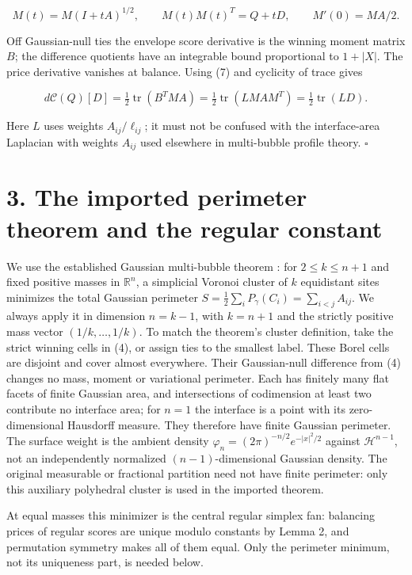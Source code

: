 \documentclass[11pt]{article}
\begin{document}
\[
 M(t)=M(I+tA)^{1/2},\qquad M(t)M(t)^T=Q+tD,\qquad
 M'(0)=MA/2.
\]

Off Gaussian-null ties the envelope score derivative is the winning
moment matrix \(B\); the difference quotients have an integrable bound
proportional to \(1+|X|\). The price derivative vanishes at balance.
Using (7) and cyclicity of trace gives

\[
 d\mathcal C(Q)[D]=\tfrac12\operatorname{tr}(B^TMA)
   =\tfrac12\operatorname{tr}(LMAM^T)
   =\tfrac12\operatorname{tr}(LD).
\]

Here \(L\) uses weights \(A_{ij}/\ell_{ij}\); it must not be confused
with the interface-area Laplacian with weights \(A_{ij}\) used elsewhere
in multi-bubble profile theory. \(\square\)

\section{3. The imported perimeter theorem and the regular
constant}\label{the-imported-perimeter-theorem-and-the-regular-constant}

We use the established Gaussian multi-bubble theorem
\cite[Theorem 1.1]{MN22}: for \(2\le k\le n+1\) and fixed positive
masses in \(\mathbb R^n\), a simplicial Voronoi cluster of \(k\)
equidistant sites minimizes the total Gaussian perimeter
\(S=\frac12\sum_i P_\gamma(C_i)=\sum_{i<j}A_{ij}\). We always apply it
in dimension \(n=k-1\), with \(k=n+1\) and the strictly positive mass
vector \((1/k,\ldots,1/k)\). To match the theorem's cluster definition,
take the strict winning cells in (4), or assign ties to the smallest
label. These Borel cells are disjoint and cover almost everywhere. Their
Gaussian-null difference from (4) changes no mass, moment or variational
perimeter. Each has finitely many flat facets of finite Gaussian area,
and intersections of codimension at least two contribute no interface
area; for \(n=1\) the interface is a point with its zero-dimensional
Hausdorff measure. They therefore have finite Gaussian perimeter. The
surface weight is the ambient density
\(\varphi_n=(2\pi)^{-n/2}e^{-|x|^2/2}\) against \(\mathcal H^{n-1}\),
not an independently normalized \((n-1)\)-dimensional Gaussian density.
The original measurable or fractional partition need not have finite
perimeter: only this auxiliary polyhedral cluster is used in the
imported theorem.

At equal masses this minimizer is the central regular simplex fan:
balancing prices of regular scores are unique modulo constants by Lemma
2, and permutation symmetry makes all of them equal. Only the perimeter
minimum, not its uniqueness part, is needed below.
\end{document}
